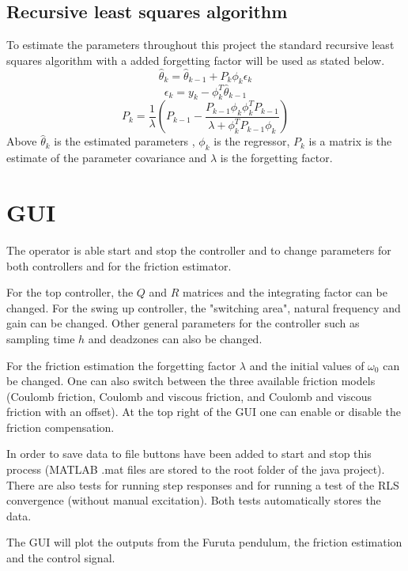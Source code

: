 \documentclass[10pt,a4paper]{article}
\begin{document}
\subsection{Recursive least squares algorithm}
\label{subsec:rlsalg}
To estimate the parameters throughout this project the standard recursive least squares algorithm with a added forgetting factor will be used as stated below. 
\begin{equation}
\hat{\theta}_k = \hat{\theta}_{k-1}+P_k\phi_k\epsilon_k 
\end{equation}
\begin{equation}
\epsilon_k=y_k-\phi_k^{T}\hat{\theta}_{k-1} 
\end{equation}
\begin{equation}
P_k=\frac{1}{\lambda}(P_{k-1}-\frac{P_{k-1}\phi_k\phi_k^{T}P_{k-1}}{\lambda+\phi_k^{T}P_{k-1}\phi_k})
\end{equation}
Above $\hat{\theta}_k$ is the estimated parameters , $\phi_k$ is the regressor, $P_k$ is a matrix is the estimate of the parameter covariance and $\lambda$ is the forgetting factor.

\section{GUI}
The operator is able start and stop the controller and to change parameters for both controllers and for the friction estimator.

For the top controller, the $Q$ and $R$ matrices and the integrating factor can be changed. For the swing up controller, the "switching area", natural frequency and gain can be changed. Other general parameters for the controller such as sampling time $h$ and deadzones can also be changed.

For the friction estimation the forgetting factor $\lambda$ and the initial values of $\omega _0$ can be changed. One can also switch between the three available friction models (Coulomb friction, Coulomb and viscous friction, and Coulomb and viscous friction with an offset). At the top right of the GUI one can enable or disable the friction compensation.

In order to save data to file buttons have been added to start and stop this process (MATLAB .mat files are stored to the root folder of the java project). There are also tests for running step responses and for running a test of the RLS convergence (without manual excitation). Both tests automatically stores the data. 

The GUI will plot the outputs from the Furuta pendulum, the friction estimation and the control signal.
\end{document}
